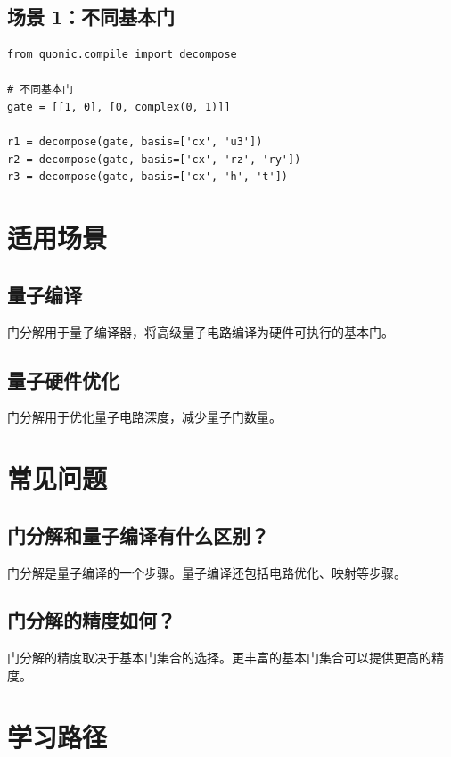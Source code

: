 \documentclass[12pt,a4paper]{article}
\begin{document}
\subsection{场景 1：不同基本门}

\begin{verbatim}
from quonic.compile import decompose

# 不同基本门
gate = [[1, 0], [0, complex(0, 1)]]

r1 = decompose(gate, basis=['cx', 'u3'])
r2 = decompose(gate, basis=['cx', 'rz', 'ry'])
r3 = decompose(gate, basis=['cx', 'h', 't'])
\end{verbatim}

\section{适用场景}

\subsection{量子编译}

门分解用于量子编译器，将高级量子电路编译为硬件可执行的基本门。

\subsection{量子硬件优化}

门分解用于优化量子电路深度，减少量子门数量。

\section{常见问题}

\subsection{门分解和量子编译有什么区别？}

门分解是量子编译的一个步骤。量子编译还包括电路优化、映射等步骤。

\subsection{门分解的精度如何？}

门分解的精度取决于基本门集合的选择。更丰富的基本门集合可以提供更高的精度。

\section{学习路径}
\end{document}
